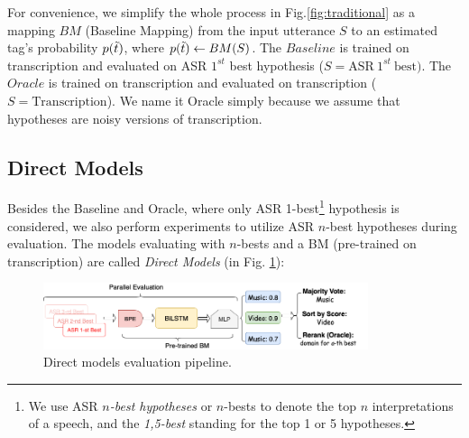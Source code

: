 For convenience, we simplify the whole process in Fig.\ref{fig:traditional} as a mapping $BM$ (Baseline Mapping) from the input utterance $S$ to an estimated tag's probability $p(\Tilde{t})$, where $p(\Tilde{t}) \leftarrow BM(S)$.
The $Baseline$ is trained on transcription and evaluated on ASR $1^{st}$ best hypothesis ($S=\text{ASR}\ 1^{st}\  \text{best})$. The $Oracle$ is trained on transcription and evaluated on transcription ($S = \text{Transcription}$). We name it Oracle simply because we assume that hypotheses are noisy versions of transcription. 
\subsection{Direct Models}
\label{subspeech:combination}

Besides the Baseline and Oracle, where only ASR 1-best\footnote{We use ASR \textit{$n$-best hypotheses} or $n$-bests to denote the top $n$ interpretations of a speech, and the \textit{1,5-best} standing for the top 1 or 5 hypotheses.} 
hypothesis is considered, we also perform experiments to utilize ASR $n$-best hypotheses during evaluation. The models evaluating with $n$-bests and a BM (pre-trained on transcription) are called \textit{Direct Models} (in Fig. \ref{fig:eval}):

\begin{figure}[!htp]
	\vspace{2em}
	\begin{center}
			\includegraphics[width=0.85\textwidth]{Graph/speech/Evaluate.png}
	\end{center}

	\caption{Direct models evaluation pipeline.}
	\label{fig:eval}
	
\end{figure}

